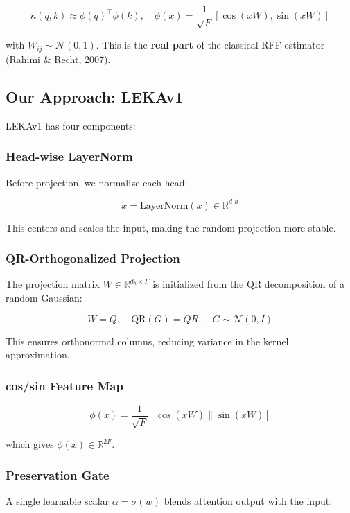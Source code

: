 \[
\kappa(q, k) \approx \phi(q)^\top \phi(k), \quad
\phi(x) = \frac{1}{\sqrt{F}} \left[ \cos(x W), \sin(x W) \right]
\tag{1.4}
\]

with $W_{ij} \sim \mathcal{N}(0, 1)$. This is the \textbf{real part} of the 
classical RFF estimator (Rahimi \& Recht, 2007).

\subsection{Our Approach: LEKAv1}

LEKAv1 has four components:

\subsubsection{Head-wise LayerNorm}

Before projection, we normalize each head:

\[
\tilde{x} = \text{LayerNorm}(x) \in \mathbb{R}^{d\_h}
\tag{1.5}
\]

This centers and scales the input, making the random projection more 
stable.

\subsubsection{QR-Orthogonalized Projection}

The projection matrix $W \in \mathbb{R}^{d_h \times F}$ is initialized from 
the QR decomposition of a random Gaussian:

\[
W = Q, \quad \text{QR}(G) = QR, \quad G \sim \mathcal{N}(0, I)
\tag{1.6}
\]

This ensures orthonormal columns, reducing variance in the kernel 
approximation.

\subsubsection{cos/sin Feature Map}

\[
\phi(x) = \frac{1}{\sqrt{F}} [\cos(\tilde{x} W) \| \sin(\tilde{x} W)]
\tag{1.7}
\]

which gives $\phi(x) \in \mathbb{R}^{2F}$.

\subsubsection{Preservation Gate}

A single learnable scalar $\alpha = \sigma(w)$ blends attention output 
with the input:

